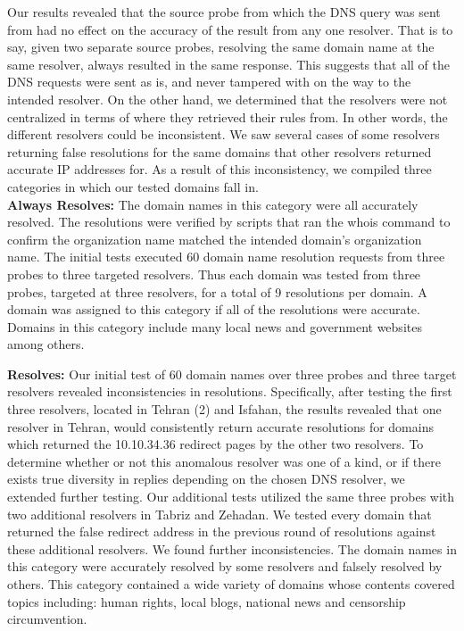         Our results revealed that the source probe from which the DNS query was sent from had no effect on the accuracy of the result from any one resolver. That is to say, given two separate source probes, resolving the same domain name at the same resolver, always resulted in the same response. This suggests that all of the DNS requests were sent as is, and never tampered with on the way to the intended resolver. On the other hand, we determined that the resolvers were not centralized in terms of where they retrieved their rules from. In other words, the different resolvers could be inconsistent. We saw several cases of some resolvers returning false resolutions for the same domains that other resolvers returned accurate IP addresses for. As a result of this inconsistency, we compiled three categories in which our tested domains fall in.\\


\textbf{Always Resolves:} The domain names in this category were all accurately resolved. The resolutions were verified by scripts that ran the whois command to confirm the organization name matched the intended domain’s organization name. The initial tests executed 60 domain name resolution requests from three probes to three targeted resolvers. Thus each domain was tested from three probes, targeted at three resolvers, for a total of 9 resolutions per domain. A domain was assigned to this category if all of the resolutions were accurate. Domains in this category include many local news and government websites among others.

\textbf{ Resolves:} Our initial test of 60 domain names over three probes and three target resolvers revealed inconsistencies in resolutions. Specifically, after testing the first three resolvers, located in Tehran (2) and Isfahan, the results revealed that one resolver in Tehran, would consistently return accurate resolutions for domains which returned the 10.10.34.36 redirect pages by the other two resolvers. To determine whether or not this anomalous resolver was one of a kind, or if there exists true diversity in replies depending on the chosen DNS resolver, we extended further testing. Our additional tests utilized the same three probes with two additional resolvers in Tabriz and Zehadan. We tested every domain that returned the false redirect address in the previous round of resolutions against these additional resolvers. We found further inconsistencies. The domain names in this category were accurately resolved by some resolvers and falsely resolved by others. This category contained a wide variety of domains whose contents covered topics including: human rights, local blogs, national news and censorship circumvention.

